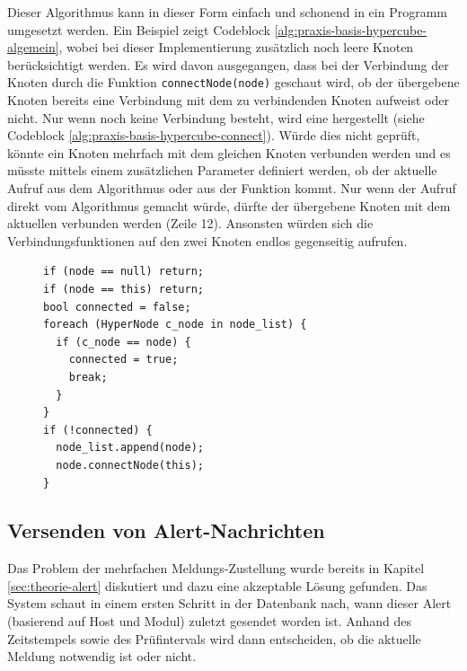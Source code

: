 Dieser Algorithmus kann in dieser Form einfach und schonend in ein Programm umgesetzt werden. Ein Beispiel zeigt Codeblock \ref{alg:praxis-basis-hypercube-algemein}, wobei bei dieser Implementierung zus\"atzlich noch leere Knoten ber\"ucksichtigt werden. Es wird davon ausgegangen, dass bei der Verbindung der Knoten durch die Funktion \texttt{connectNode(node)} geschaut wird, ob der \"ubergebene Knoten bereits eine Verbindung mit dem zu verbindenden Knoten aufweist oder nicht. Nur wenn noch keine Verbindung besteht, wird eine hergestellt (siehe Codeblock \ref{alg:praxis-basis-hypercube-connect}). W\"urde dies nicht gepr\"uft, k\"onnte ein Knoten mehrfach mit dem gleichen Knoten verbunden werden und es m\"usste mittels einem zus\"atzlichen Parameter definiert werden, ob der aktuelle Aufruf aus dem Algorithmus oder aus der Funktion kommt. Nur wenn der Aufruf direkt vom Algorithmus gemacht w\"urde, d\"urfte der \"ubergebene Knoten mit dem aktuellen verbunden werden (Zeile 12). Ansonsten w\"urden sich die Verbindungsfunktionen auf den zwei Knoten endlos gegenseitig aufrufen.

\begin{figure}[h]
 \lstset{language=[ISO]C++}
 \begin{lstlisting}[label=alg:praxis-basis-hypercube-connect,caption={[Verbinden von zwei Hypercube-Nodes]Die Funktion, welche zwei Knoten verbindet, pr\"uft zuerst ob der Knoten nicht schon in der Liste vorhanden ist. Wenn nicht, wird der Knoten eingef\"ugt und die gleiche Funktion auf dem zu verbindenden Knoten aufgerufen. Ohne diese Pr\"ufung w\"urde hier eine endlose Aufruf-Aktion stattfinden.}]
if (node == null) return;
if (node == this) return;
bool connected = false;
foreach (HyperNode c_node in node_list) {
  if (c_node == node) {
    connected = true;
    break;
  }
}
if (!connected) {
  node_list.append(node);
  node.connectNode(this);
}
 \end{lstlisting}
\end{figure}

\subsection{Versenden von Alert-Nachrichten} \label{sec:praxis-basis-sendalert}
Das Problem der mehrfachen Meldungs-Zustellung wurde bereits in Kapitel \ref{sec:theorie-alert} diskutiert und dazu eine akzeptable L\"osung gefunden. Das System schaut in einem ersten Schritt in der Datenbank nach, wann dieser Alert (basierend auf Host und Modul) zuletzt gesendet worden ist. Anhand des Zeitstempels sowie des Pr\"ufintervals wird dann entscheiden, ob die aktuelle Meldung notwendig ist oder nicht.

